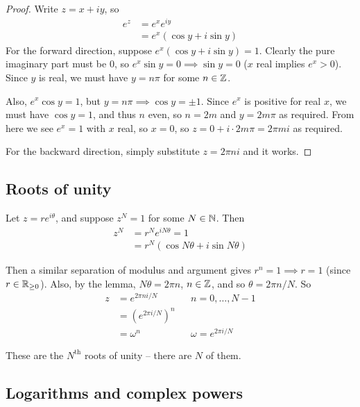 \documentclass{../template/note}
\begin{document}
    \begin{proof}
        Write \(z = x + iy\), so
        \begin{align*}
            e^z &= e^xe^{iy} \\
            &= e^x(\cos y + i \sin y)
        \end{align*}
        For the forward direction, suppose \(e^x(\cos y + i \sin y) = 1\). Clearly the pure imaginary part must be 0, so \(e^x \sin y = 0 \implies \sin y = 0\) (\(x\) real implies \(e^x > 0\)). Since \(y\) is real, we must have \(y = n\pi\) for some \(n \in \mathbb Z\).

        Also, \(e^x \cos y = 1\), but \(y = n \pi \implies \cos y = \pm 1\). Since \(e^x\) is positive for real \(x\), we must have \(\cos y = 1\), and thus \(n\) even, so \(n = 2m\) and \(y = 2m\pi\) as required. From here we see \(e^x = 1\) with \(x\) real, so \(x = 0\), so \(z = 0 + i \cdot 2 m \pi = 2 \pi m i\) as required.

        For the backward direction, simply substitute \(z = 2\pi n i\) and it works.
    \end{proof}
    
    \subsection{Roots of unity}

    Let \(z = re^{i \theta}\), and suppose \(z^N = 1\) for some \(N \in \mathbb N\). Then
    \begin{align*}
        z^N &= r^Ne^{iN\theta} = 1 \\
        &= r^N(\cos N\theta + i \sin N\theta)
    \end{align*}

    Then a similar separation of modulus and argument gives \(r^n = 1 \implies r = 1\) (since \(r \in \mathbb R_{\geq 0}\)). Also, by the lemma, \(N \theta = 2 \pi n\), \(n \in \mathbb Z\), and so \(\theta = 2\pi n / N\). So
    \begin{align*}
        z &= e^{2\pi n i / N} && n = 0, \dots, N-1 \\
        &= (e^{2\pi i / N})^n \\
        &= \omega^n && \omega = e^{2 \pi i / N}
    \end{align*}
    
    These are the \(N^\text{th}\) roots of unity -- there are \(N\) of them.

    \subsection{Logarithms and complex powers}
\end{document}
